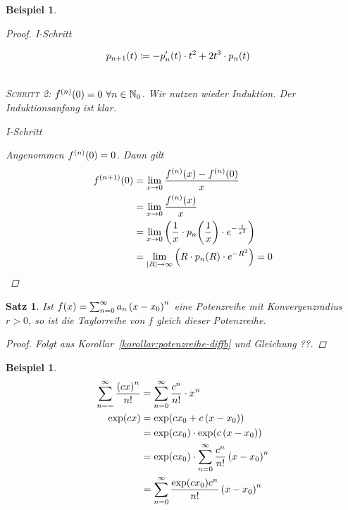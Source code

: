 \documentclass[11pt, twoside, a4paper]{article}
\theoremstyle{plain}
\newtheorem{satz}[blockelement]{Satz}
\newtheorem{beispiel}[blockelement]{Beispiel}
\numberwithin{equation}{subsection}
\newcommand{\pair}[1]{\left(#1\right)}
\newcommand{\of}[1]{\mathopen{}\mathclose{}\bgroup\left(#1\aftergroup\egroup\right)}
\newcommand{\abs}[1]{\left\lvert#1\right\rvert}
\newcommand{\fromto}{\rightarrow{}}
\newcommand{\N}{\mathbb{N}}
\newenvironment{induktionsschritt}{
    \rule{0pt}{3ex}\noindent
    \begin{minipage}[t]{0.11\textwidth}
    {I-Schritt}
    \end{minipage}
    \hfill
    \begin{minipage}[t]{0.89\textwidth}
    }
    {
    \end{minipage}
}
\begin{document}
\begin{beispiel}
\begin{proof}
\begin{induktionsschritt}
\begin{align*}
                    p_{n+1}\of{t} &\coloneqq -p'_n\of{t}\cdot t^2 + 2t^3\cdot p_n\of{t}
                \end{align*}
            \end{induktionsschritt}~\\
            \textsc{Schritt 2}: $f^{(n)}\of{0} = 0~\forall n\in\N_0$. Wir nutzen wieder Induktion. Der Induktionsanfang ist klar.
            \begin{induktionsschritt}
                Angenommen $f^{(n)}\of{0} = 0$. Dann gilt
                \begin{align*}
                    f^{(n+1)}\of{0} &= \lim_{x\fromto 0} \frac{f^{(n)}\of{x} - f^{(n)}\of{0}}{x}\\
                    &= \lim_{x\fromto 0} \frac{f^{(n)}\of{x}}{x}\\
                    &= \lim_{x\fromto 0}\pair{\frac{1}{x}\cdot p_n\of{\frac{1}{x}}\cdot e^{-\frac{1}{x^2}}}\\
                    &= \lim_{\abs{R}\fromto \infty} \pair{R\cdot p_n\of{R}\cdot e^{-R^2}} = 0\qedhere
                \end{align*}
            \end{induktionsschritt}
        \end{proof}
    \end{beispiel}

    \begin{satz} %
        Ist $f\of{x} = \sum_{n=0}^{\infty} a_n\pair{x-x_0}^{n}$ eine Potenzreihe mit Konvergenzradius $r>0$, so ist die Taylorreihe von $f$ gleich dieser Potenzreihe.
        \begin{proof}
            Folgt aus Korollar~\ref{korollar:potenzreihe-diffb} und Gleichung ??.
        \end{proof}
    \end{satz}

    \begin{beispiel}
        \begin{align*}
            \sum_{n==}^{\infty} \frac{\pair{cx}^n}{n!} &= \sum_{n=0}^{\infty} \frac{c^n}{n!}\cdot x^n\\
            \exp\of{cx} &= \exp\of{cx_0 + c\pair{x-x_0}}\\
            &= \exp\of{cx_0}\cdot\exp\of{c\pair{x-x_0}}\\
            &= \exp\of{cx_0}\cdot \sum_{n=0}^{\infty} \frac{c^n}{n!}\pair{x-x_0}^n\\
            &= \sum_{n=0}^{\infty} \frac{\exp\of{cx_0}c^n}{n!}\pair{x-x_0}^n
        \end{align*}
    \end{beispiel}
\end{document}
